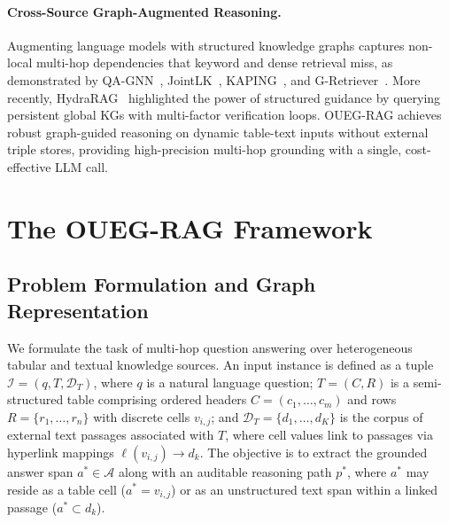 \documentclass[runningheads]{llncs}
\begin{document}
\paragraph{Cross-Source Graph-Augmented Reasoning.}
Augmenting language models with structured knowledge graphs captures non-local multi-hop dependencies that keyword and dense retrieval miss, as demonstrated by QA-GNN~\cite{yasunaga2021qagnn}, JointLK~\cite{sun2022jointlk}, KAPING~\cite{baek2023kaped}, and G-Retriever~\cite{he2024gretriever}. More recently, HydraRAG~\cite{tan2025hydrarag} highlighted the power of structured guidance by querying persistent global KGs with multi-factor verification loops. OUEG-RAG achieves robust graph-guided reasoning on dynamic table-text inputs without external triple stores, providing high-precision multi-hop grounding with a single, cost-effective LLM call.

\section{The OUEG-RAG Framework}
\label{sec:method}
\label{sec:problem}

\subsection{Problem Formulation and Graph Representation}
\label{sec:formulation}
We formulate the task of multi-hop question answering over heterogeneous tabular and textual knowledge sources. An input instance is defined as a tuple $\mathcal{I} = (q, T, \mathcal{D}_T)$, where $q$ is a natural language question; $T = (C, R)$ is a semi-structured table comprising ordered headers $C = (c_1, \dots, c_m)$ and rows $R = \{r_1, \dots, r_n\}$ with discrete cells $v_{i,j}$; and $\mathcal{D}_T = \{d_1, \dots, d_K\}$ is the corpus of external text passages associated with $T$, where cell values link to passages via hyperlink mappings $\ell(v_{i,j}) \rightarrow d_k$. The objective is to extract the grounded answer span $a^* \in \mathcal{A}$ along with an auditable reasoning path $p^*$, where $a^*$ may reside as a table cell ($a^* = v_{i,j}$) or as an unstructured text span within a linked passage ($a^* \subset d_k$).
\end{document}
